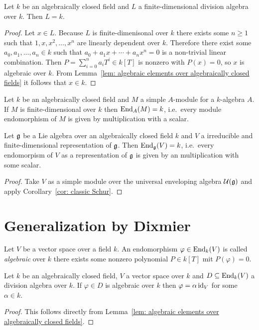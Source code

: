 \begin{cor}
 Let $k$ be an algebraically closed field and $L$ a finite-dimensional division algebra over $k$. Then $L = k$.
\end{cor}
\begin{proof}
 Let $x \in L$. Because $L$ is finite-dimenisonal over $k$ there exists some $n \geq 1$ such that $1, x, x^2, \dotsc, x^n$ are linearly dependent over $k$. Therefore there exist some $a_0, a_1, \dotsc, a_n \in k$ such that $a_0 + a_1 x + \dotsb + a_n x^n = 0$ is a non-trivial linear combination. Then $P = \sum_{i=0}^n a_i T^i \in k[T]$ is nonzero with $P(x) = 0$, so $x$ is algebraic over $k$. From Lemma~\ref{lem: algebraic elements over algebraically closed fields} it follows that $x \in k$.
\end{proof}


\begin{cor} \label{cor: classic Schur}
 Let $k$ be an algebraically closed field and $M$ a simple $A$-module for a $k$-algebra $A$. If $M$ is finite-dimensional over $k$ then $\operatorname{End}_A(M) = k$, i.e.\ every module endomorphism of $M$ is given by multiplication with a scalar.
\end{cor}


\begin{cor}
 Let $\mathfrak{g}$ be a Lie algebra over an algebraically closed field $k$ and $V$ a irreducible and finite-dimensional representation of $\mathfrak{g}$. Then $\operatorname{End}_{\mathfrak{g}}(V) = k$, i.e.\ every endomorpism of $V$ as a representation of $\mathfrak{g}$ is given by an multiplication with some scalar.
\end{cor}
\begin{proof}
 Take $V$ as a simple module over the universal enveloping algebra $\mathcal{U}(\mathfrak{g})$ and apply Corollary~\ref{cor: classic Schur}.
\end{proof}





\section{Generalization by Dixmier}


\begin{defi}
 Let $V$ be a vector space over a field $k$. An endomorphism $\varphi \in \operatorname{End}_k(V)$ is called \emph{algebraic} over $k$ there exists some nonzero polynomial $P \in k[T]$ mit $P(\varphi) = 0$.
\end{defi}


\begin{lem}\label{lem: algebraic endomorphisms over algebraically closed fields}
 Let $k$ be an algebraically closed field, $V$ a vector space over $k$ and $D \subseteq \operatorname{End}_k(V)$ a division algebra over $k$. If $\varphi \in D$ is algebraic over $k$ then $\varphi = \alpha \operatorname{id}_V$ for some $\alpha \in k$.
\end{lem}
\begin{proof}
 This follows directly from Lemma~\ref{lem: algebraic elements over algebraically closed fields}.
\end{proof}


